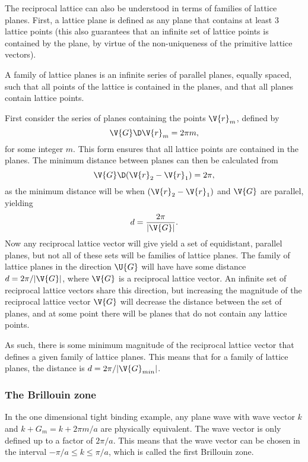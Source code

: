 \documentclass[main.tex]{subfiles}
\begin{document}
	The reciprocal lattice can also be understood in terms of families of lattice planes. First, a lattice plane is defined as any plane that contains at least 3 lattice points (this also guarantees that an infinite set of lattice points is contained by the plane, by virtue of the non-uniqueness of the primitive lattice vectors). 
	
	A family of lattice planes is an infinite series of parallel planes, equally spaced, such that all points of the lattice is contained in the planes, and that all planes contain lattice points.
	
	First consider the series of planes containing the points $ \V{r}_m $, defined by
	\begin{equation}\label{key}
		\V{G} \D \V{r}_m = 2\pi m,
	\end{equation}
	for some integer $ m $. This form ensures that all lattice points are contained in the planes. The minimum distance between planes can then be calculated from
	\begin{equation}\label{key}
		\V{G} \D (\V{r}_2 - \V{r}_1) = 2\pi,
	\end{equation}
	as the minimum distance will be when $ (\V{r}_2-\V{r}_1) $ and $ \V{G} $ are parallel, yielding
	\begin{equation}\label{key}
		d = \frac{2\pi}{|\V{G}|}.
	\end{equation}
	Now any reciprocal lattice vector will give yield a set of equidistant, parallel planes, but not all of these sets will be families of lattice planes. The family of lattice planes in the direction $ \U{G} $ will have have some distance $ d = 2\pi /|\V{G}| $, where $ \V{G} $ is a reciprocal lattice vector. An infinite set of reciprocal lattice vectors share this direction, but increasing the magnitude of the reciprocal lattice vector $ \V{G} $ will decrease the distance between the set of planes, and at some point there will be planes that do not contain any lattice points.
	
	As such, there is some minimum magnitude of the reciprocal lattice vector that defines a given family of lattice planes. This means that for a family of lattice planes, the distance is $ d = 2\pi /| \V{G}_{min}| $.
	
	\subsubsection{The Brillouin zone}
	In the one dimensional tight binding example, any plane wave with wave vector $ k $ and $ k + G_m = k + 2\pi m/a $ are physically equivalent. The wave vector is only defined up to a factor of $ 2 \pi / a $. This means that the wave vector can be chosen in the interval $ -\pi /a \leq k \leq \pi/a $, which is called the first Brillouin zone.
	
\end{document}
